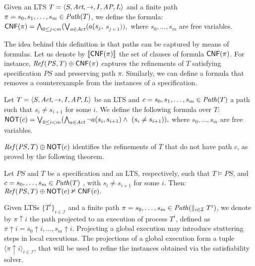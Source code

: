 \begin{definition}Given an LTS $T = \langle S, \textit{Act}, \rightarrow, I, \textit{AP}, L \rangle$ and a finite path $\pi = s_0, s_1, \dots ,s_{m} \in \mathit{Path}(T)$, we define the formula:
$
\mathsf{CNF}(\pi) = \bigwedge_{0 \leq j < m}(\bigvee_{a \in \mathit{Act}}(a(s_j,$ $s_{j+1})),
$
where $s_0,\dots,s_m$ are free variables.
\end{definition}

The idea behind this definition is that paths can be captured by means of formulas. Let us denote by  $\llbracket \mathsf{CNF}(\pi) \rrbracket$ the set of clauses of formula $\mathsf{CNF}(\pi)$. For instance, $\mathit{Ref}(\mathit{PS},T) \oplus \mathsf{CNF}(\pi)$ captures the refinements of $T$ satisfying specification $\mathit{PS}$ and preserving path $\pi$. Similarly, we can define a formula that removes a counterexample from the instances of a specification.

\begin{definition}\label{def:not} Let $T = \langle S, \textit{Act}, \rightarrow, I, \textit{AP}, L \rangle$ be an LTS and $c = s_0, s_1, \dots, s_m \in \mathit{Path}(T)$ a path such that $s_i \neq s_{i+1}$ for some $i$. We define the following formula over $T$:
$
\mathsf{NOT}(c) = \bigvee_{0 \leq i < m} (\bigwedge_{a \in \mathit{Act}} \neg  a(s_{i},s_{i+1})  \wedge \ (s_i \neq s_{i+1})),
$
where $s_0,\dots,s_m$ are free variables.
\end{definition}

$\mathit{Ref}(\mathit{PS},T) \oplus \mathsf{NOT}(c)$ identifies the refinements of $T$ that do not have path $c$, as proved by the following theorem.

\begin{theorem}\label{theorem:cex-entails} Let $\mathit{PS}$ and $T$ be a specification and an LTS, respectively, such that $T \vDash \mathit{PS}$, and $c = s_0,\dots, s_m \in \mathit{Path}(T)$ , with $s_i \neq s_{i+1}$ for some $i$. Then:
$
	\mathit{Ref}(\mathit{PS},T) \oplus \mathsf{NOT}(c)  \nvDash \mathsf{CNF}(c).
$
\end{theorem}
	
Given LTSs $\{ T^i \}_{i \in \mathcal{I}}$ and a finite path $\pi = s_0, \dots, s_m \in \mathit{Path}(\parallel_{i \in \mathcal{I}} T^i)$, we denote by $\pi {\uparrow} i$ the path projected to an execution of process $T^i$, defined as  $\pi {\uparrow} i = s_0 {\uparrow} i, \dots, s_m {\uparrow} i$. Projecting a global execution may introduce stuttering steps in local executions. The projections of a global execution form a tuple  $\langle \pi{\uparrow}i \rangle_{i \in \mathcal{I}}$, that will be used to refine the instances obtained via the satisfiability solver. 

